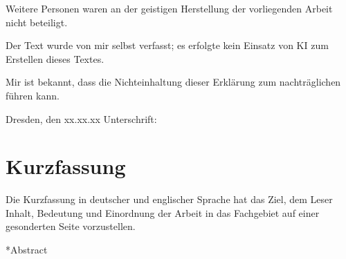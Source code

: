 \documentclass[%
  paper=a4,
  fontsize=12pt,
  twoside=false,
  headsepline=true,
  numbers=noenddot]{scrartcl}
\begin{document}
\noindent Weitere Personen waren an der geistigen Herstellung der vorliegenden Arbeit nicht beteiligt.

\noindent Der Text wurde von mir selbst verfasst; es erfolgte kein Einsatz von KI zum Erstellen dieses Textes.

\noindent Mir ist bekannt, dass die Nichteinhaltung dieser Erklärung  zum nachträglichen
 führen kann.

\vspace*{2cm}
\noindent Dresden, den xx.xx.xx \hspace{3cm} Unterschrift: \\

\cleardoublepage


\section*{Kurzfassung}

Die Kurzfassung in deutscher und englischer Sprache hat das Ziel, dem Leser Inhalt, Bedeutung und Einordnung der Arbeit in das Fachgebiet auf einer gesonderten Seite vorzustellen.

\vspace*{2cm}

\makeatletter
{} %
\makeatother

\cleardoublepage



\tableofcontents



\listoffigures


\end{document}
